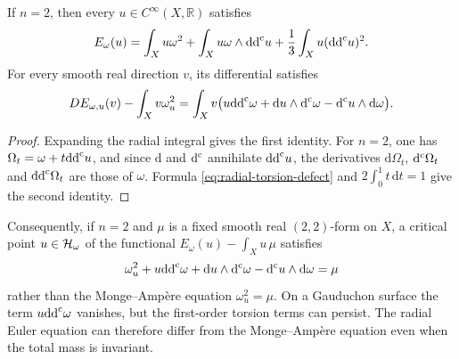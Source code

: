 \begin{proposition}\label{prop:radial-surface}
If $n=2$, then every $u\in C^\infty(X,\mathbb R)$ satisfies
\[
 E_\omega(u)=\int_Xu\omega^2
 +\int_Xu\omega\wedge\mathrm{dd}^{\mathrm{c}} u
 +\frac13\int_Xu(\mathrm{dd}^{\mathrm{c}} u)^2.
\]
For every smooth real direction $v$, its differential satisfies
\begin{equation}\label{eq:radial-defect}
 DE_{\omega,u}(v)-\int_Xv\omega_u^2
 =\int_Xv\bigl(u\mathrm{dd}^{\mathrm{c}}\omega+\mathrm{d}u\wedge\mathrm d^{\mathrm c}\omega
                      -\mathrm d^{\mathrm c} u\wedge \mathrm{d}\omega\bigr).
\end{equation}
\end{proposition}
\begin{proof}
Expanding the radial integral gives the first identity. For $n=2$, one has $\Omega_t=\omega+t\mathrm{dd}^{\mathrm{c}} u$, and since $\mathrm d$ and $\mathrm d^{\mathrm c}$ annihilate $\mathrm{dd}^{\mathrm{c}} u$, the derivatives $\mathrm d\Omega_t$, $\mathrm d^{\mathrm c}\Omega_t$ and $\mathrm{dd}^{\mathrm{c}}\Omega_t$ are those of $\omega$. Formula \eqref{eq:radial-torsion-defect} and $2\int_0^1t\,\mathrm dt=1$ give the second identity.
\end{proof}

Consequently, if $n=2$ and $\mu$ is a fixed smooth real $(2,2)$-form on $X$, a critical point $u\in\mathcal H_\omega$ of the functional $E_\omega(u)-\int_Xu\,\mu$ satisfies
\[
 \omega_u^2+u\mathrm{dd}^{\mathrm{c}}\omega+\mathrm{d}u\wedge\mathrm d^{\mathrm c}\omega
                  -\mathrm d^{\mathrm c} u\wedge\mathrm{d}\omega=\mu
\]
rather than the Monge--Amp\`ere equation $\omega_u^2=\mu$. On a Gauduchon surface the term $u\mathrm{dd}^{\mathrm{c}}\omega$ vanishes, but the first-order torsion terms can persist. The radial Euler equation can therefore differ from the Monge--Amp\`ere equation even when the total mass is invariant.


